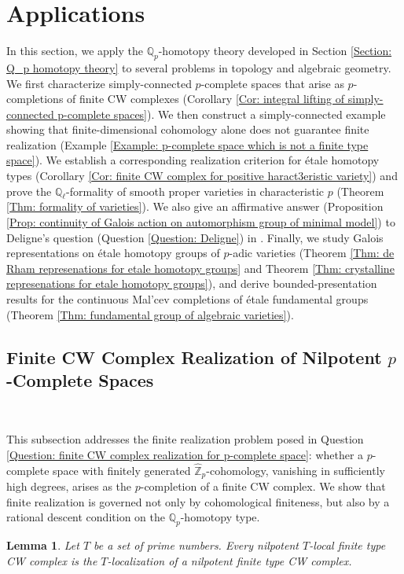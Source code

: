 \documentclass[11pt]{amsart}
\newtheorem{lemma}[theorem]{Lemma}
\theoremstyle{definition}
\numberwithin{equation}{section}
\numberwithin{equation}{section}
\newcommand\QQ{\mathbb{Q}}
\newcommand\ZZ{\mathbb{Z}}
\begin{document}
\section{Applications}\label{Section: Application}
In this section, we apply the $\QQ_p$-homotopy theory developed in Section \ref{Section: Q_p homotopy theory} to several problems in topology and algebraic geometry. We first characterize simply-connected $p$-complete spaces that arise as $p$-completions of finite CW complexes (Corollary \ref{Cor: integral lifting of simply-connected p-complete spaces}). We then construct a simply-connected example showing that finite-dimensional cohomology alone does not guarantee finite realization (Example \ref{Example: p-complete space which is not a finite type space}). We establish a corresponding realization criterion for \'etale homotopy types (Corollary \ref{Cor: finite CW complex for positive haract3eristic variety}) and prove the $\QQ_{\ell}$-formality of smooth proper varieties in characteristic $p$ (Theorem \ref{Thm: formality of varieties}). We also give an affirmative answer (Proposition \ref{Prop: continuity of Galois action on automorphism group of minimal model}) to Deligne's question (Question \ref{Question: Deligne}) in \cite{Deligne-Weil-II}. Finally, we study Galois representations on \'etale homotopy groups of $p$-adic varieties (Theorem \ref{Thm: de Rham represenations for etale homotopy groups} and Theorem \ref{Thm: crystalline represenations for etale homotopy groups}), and derive bounded-presentation results for the continuous Mal’cev completions of \'etale fundamental groups (Theorem \ref{Thm: fundamental group of algebraic varieties}).

\subsection{Finite CW Complex Realization of Nilpotent $p$-Complete Spaces}\label{subsection: finite CW complex realization of nilpotent spaces}\,

This subsection addresses the finite realization problem posed in Question \ref{Question: finite CW complex realization for p-complete space}: whether a $p$-complete space with finitely generated $\widehat{\ZZ}_{p}$-cohomology, vanishing in sufficiently high degrees, arises as the $p$-completion of a finite CW complex. We show that finite realization is governed not only by cohomological finiteness, but also by a rational descent condition on the $\QQ_{p}$-homotopy type.

\begin{lemma}\label{Lem: local spaces have an integral lifting}
Let $T$ be a set of prime numbers. Every nilpotent $T$-local finite type CW complex is the $T$-localization of a nilpotent finite type CW complex.  
\end{lemma} 
\end{document}

